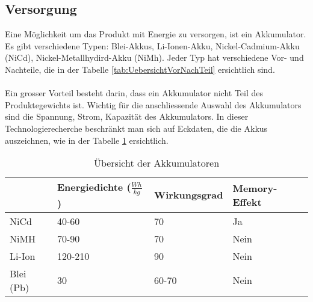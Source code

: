 \subsection{Versorgung}
Eine Möglichkeit um das Produkt mit Energie zu versorgen, ist ein Akkumulator. Es gibt verschiedene Typen: Blei-Akkus, Li-Ionen-Akku, Nickel-Cadmium-Akku (NiCd), Nickel-Metallhydird-Akku (NiMh). Jeder Typ hat verschiedene Vor- und Nachteile, die in der Tabelle \ref{tab:UebersichtVorNachTeil} ersichtlich sind.\\
\\
Ein grosser Vorteil besteht darin, dass ein Akkumulator nicht Teil des Produktegewichts ist. Wichtig für die anschliessende Auswahl des Akkumulators sind die Spannung, Strom, Kapazität des Akkumulators. In dieser Technologierecherche beschränkt man sich auf Eckdaten, die die Akkus auszeichnen, wie in der Tabelle \ref{tab:UebersichtAkku} ersichtlich.\\ 

\begin{table}[h!]
	\begin{tabular}{|p{1.5cm}|p{2.3cm}|p{3cm}|p{3cm}|} \hline
		          &\textbf{Energiedichte ($\frac{Wh}{kg}$})  & \textbf{Wirkungsgrad} & \textbf{Memory-Effekt}\\ \hline
		NiCd      & 40-60                                    & 70                    & Ja \\ \hline
		NiMH      & 70-90                                    & 70                    & Nein  \\ \hline
		Li-Ion    & 120-210                                  & 90                    & Nein \\ \hline
		Blei (Pb) & 30                                       & 60-70                 & Nein \\ \hline
	\end{tabular}
	\centering
	\caption{Übersicht der Akkumulatoren}
	\label{tab:UebersichtAkku} 
\end{table}

